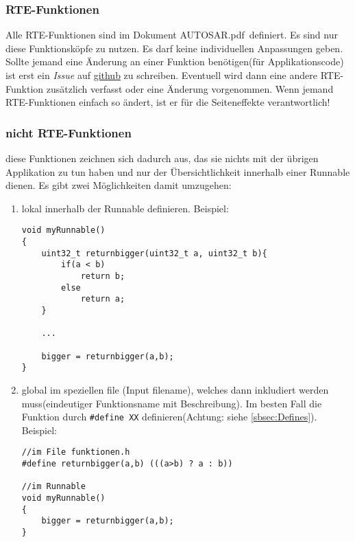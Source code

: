\documentclass[]{scrartcl}
\newcommand{\DokAutosar}{AUTOSAR.pdf}
\begin{document}
\subsubsection{RTE-Funktionen}
\label{sbbsec:RTE-Funktionen}
Alle RTE-Funktionen sind im Dokument \DokAutosar~definiert. Es sind nur diese Funktionsköpfe zu nutzen. Es darf keine individuellen Anpassungen geben. Sollte jemand eine Änderung an einer Funktion benötigen(für Applikationscode) ist erst ein \textit{Issue} auf \href{www.github.com}{github} zu schreiben. Eventuell wird dann eine andere RTE-Funktion zusätzlich verfasst oder eine Änderung vorgenommen. Wenn jemand RTE-Funktionen einfach so ändert, ist er für die Seiteneffekte verantwortlich!


\subsubsection{nicht RTE-Funktionen}
\label{sbbsec:nicht RTE-Funktionen}
diese Funktionen zeichnen sich dadurch aus, das sie nichts mit der übrigen Applikation zu tun haben und nur der Übersichtlichkeit innerhalb einer Runnable dienen. Es gibt zwei Möglichkeiten damit umzugehen:
\begin{enumerate}[1.)]
\item lokal innerhalb der Runnable definieren. Beispiel:
\begin{lstlisting}
void myRunnable()
{
	uint32_t returnbigger(uint32_t a, uint32_t b){
		if(a < b)
			return b;
		else
			return a;
	}
	
	...
	
	bigger = returnbigger(a,b);
}
\end{lstlisting}
\item global im speziellen file (Input filename), welches dann inkludiert werden muss(eindeutiger Funktionsname mit Beschreibung).
Im besten Fall die Funktion durch \lstinline|#define XX| definieren(Achtung: siehe \ref{sbsec:Defines}). Beispiel:
\begin{lstlisting}
//im File funktionen.h
#define returnbigger(a,b) (((a>b) ? a : b))

//im Runnable
void myRunnable()
{
	bigger = returnbigger(a,b);
}
\end{lstlisting}

\end{enumerate}
\end{document}
